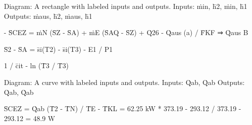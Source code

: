 Diagram: A rectangle with labeled inputs and outputs.
Inputs: ṁin, h̄2, ṁin, h̄1
Outputs: ṁaus, h̄2, ṁaus, h̄1

- S̄CEZ = ṁN (S̄Z - S̄A) + ṁE (S̄AQ - S̄Z) + Q̇26 - Q̇aus (a) / F̄KF ⇒ Q̇aus B

S̄2 - S̄A = s̄i(T2) - s̄i(T3) - E1 / P1

1 / c̄it - ln (T̄3 / T̄3)

Diagram: A curve with labeled inputs and outputs.
Inputs: Q̇ab, Q̇ab
Outputs: Q̇ab, Q̇ab

S̄CEZ = Q̇ab (T̄2 - T̄N) / T̄E - T̄KL = 62.25 kW * 373.19 - 293.12 / 373.19 - 293.12 = 48.9 W